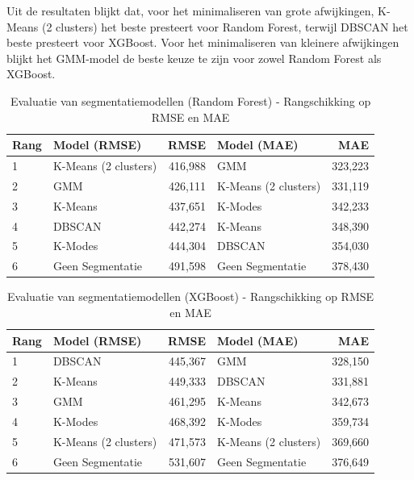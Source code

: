 \vspace{1em}

Uit de resultaten blijkt dat, voor het minimaliseren van grote afwijkingen, K-Means (2 clusters) het beste presteert voor Random Forest, terwijl DBSCAN het beste presteert voor XGBoost. Voor het minimaliseren van kleinere afwijkingen blijkt het GMM-model de beste keuze te zijn voor zowel Random Forest als XGBoost.



\begin{table}[H]
    \centering
    \caption{Evaluatie van segmentatiemodellen (Random Forest) - Rangschikking op RMSE en MAE}
    \label{tab:rf_segmentation_model_evaluation_combined}
    \begin{tabular}{|l|l|r|l|r|}
        \hline
        \textbf{Rang} & \textbf{Model (RMSE)} & \textbf{RMSE} & \textbf{Model (MAE)} & \textbf{MAE} \\ \hline
        1 & K-Means (2 clusters)     & 416,988 & GMM                      & 323,223 \\ \hline
        2 & GMM                      & 426,111 & K-Means (2 clusters)     & 331,119 \\ \hline
        3 & K-Means                  & 437,651 & K-Modes                  & 342,233 \\ \hline
        4 & DBSCAN                   & 442,274 & K-Means                  & 348,390 \\ \hline
        5 & K-Modes                  & 444,304 & DBSCAN                   & 354,030 \\ \hline
        6 & Geen Segmentatie         & 491,598 & Geen Segmentatie         & 378,430 \\ \hline
    \end{tabular}
\end{table}

\begin{table}[H]
    \centering
    \caption{Evaluatie van segmentatiemodellen (XGBoost) - Rangschikking op RMSE en MAE}
    \label{tab:segmentation_model_evaluation_xgboost_combined}
    \begin{tabular}{|l|l|r|l|r|}
        \hline
        \textbf{Rang} & \textbf{Model (RMSE)} & \textbf{RMSE} & \textbf{Model (MAE)} & \textbf{MAE} \\ \hline
        1 & DBSCAN                   & 445,367 & GMM                      & 328,150 \\ \hline
        2 & K-Means                  & 449,333 & DBSCAN                   & 331,881 \\ \hline
        3 & GMM                      & 461,295 & K-Means                  & 342,673 \\ \hline
        4 & K-Modes                  & 468,392 & K-Modes                  & 359,734 \\ \hline
        5 & K-Means (2 clusters)     & 471,573 & K-Means (2 clusters)     & 369,660 \\ \hline
        6 & Geen Segmentatie         & 531,607 & Geen Segmentatie         & 376,649 \\ \hline
    \end{tabular}
\end{table}




